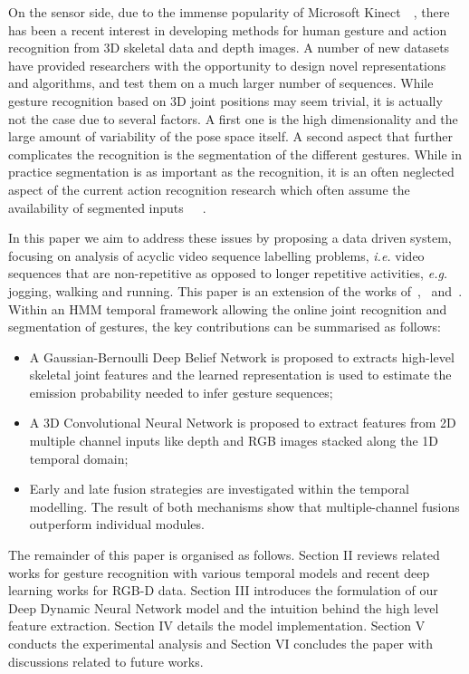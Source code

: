 On the sensor side, due to the immense popularity of Microsoft Kinect~\cite{shotton2011real}~\cite{lingshao2}, there has been a recent interest in developing methods for human gesture and action recognition from 3D skeletal data and depth images.
A number of new datasets~\cite{ICMI,fothergill2012instructing,guyon2012chalearn,wang2012mining} have provided researchers with the opportunity to design novel representations and algorithms, and test them on a much larger number of sequences.
While gesture recognition based on 3D joint positions may seem trivial, it is actually not the case due to several factors. A first one is the high dimensionality and the large amount of variability of the pose space itself.
A second aspect that further complicates the recognition is the segmentation of the different gestures. While in practice segmentation is as important as the recognition, it is an often neglected aspect of the current action recognition research which often assume the availability of segmented inputs~\cite{laptev2005space}~\cite{marszalek09}~\cite{Kuehne11}.

In this paper we aim to address these issues by proposing a data driven system, focusing on analysis of acyclic video sequence labelling problems, \emph{i.e.} video sequences that are non-repetitive as opposed to longer repetitive activities, \textit{e.g.} jogging, walking and running. This paper is an extension of the works of~\cite{diwucvpr14},~\cite{wu2014deep} and~\cite{lio2014deep}.
Within an HMM temporal framework allowing the online joint recognition and segmentation of gestures, the key contributions can be summarised as follows:
\begin{itemize}
\item A Gaussian-Bernoulli Deep Belief Network is proposed to extracts high-level skeletal joint features and the learned representation is used to estimate the emission probability needed to infer gesture sequences;
\item A 3D Convolutional Neural Network  is proposed to extract features from 2D multiple channel inputs 
like  depth and RGB images stacked along the 1D temporal domain;
\item Early and late fusion strategies are investigated within the temporal modelling. The result of both mechanisms
show that multiple-channel fusions outperform individual modules.
\end{itemize}

The remainder of this paper is organised as follows. Section II reviews related works for gesture recognition with various temporal models and recent deep learning works for RGB-D data. Section III introduces the formulation of our Deep Dynamic Neural Network model and the intuition behind the high level feature extraction. Section IV details the model implementation. Section V conducts the experimental analysis and Section VI concludes the paper with discussions related to future works.


\endinput
